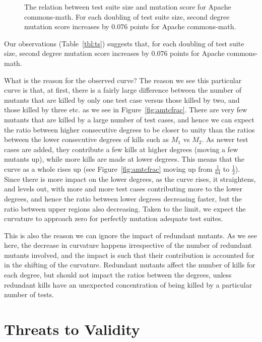 \documentclass[conference]{IEEEtran}
\newcounter{observation}
\begin{document}
\begin{figure}
\begin{Schunk}
{}

\end{Schunk}

\caption{The relation between test suite size and mutation score for Apache commons-math.
For each doubling of test suite size, second degree mutation score increases by 0.076
points for Apache commons-math.}
\label{fig:ts}
\end{figure}
Our observations (Table~\ref{tbl:ts}) suggests that, for each doubling of test
suite size, second degree mutation score increases by 0.076
points for Apache commons-math.

What is the reason for the observed curve? The reason we see this particular curve
is that, at first, there is a fairly large difference between the number
of mutants that are killed by only one test case versus those killed by two,
and those killed by three etc. as we see in Figure~\ref{fig:amtcfrac}.
There are very few mutants that are killed by a large number of test cases, and
hence we can expect the ratio between higher
consecutive degrees to be closer to unity than the ratios between the lower
consecutive degrees of kills such as $M_1$ vs $M_2$. As newer test cases are
added, they contribute a few kills at higher degrees (moving a few mutants up),
while more kills are made at lower degrees. This means that the curve as a
whole rises up (see Figure~\ref{fig:amtcfrac} moving up from $\frac{1}{64}$ to
$\frac{1}{2}$). Since there is more impact on the lower degrees, as the curve
rises, it straightens, and levels out, with more and more test cases
contributing more to the lower degrees, and hence the ratio between lower
degrees decreasing faster, but the ratio between upper regions also decreasing.
Taken to the limit, we expect the curvature to approach zero for perfectly
mutation adequate test suites.

This is also the reason we can ignore the impact of redundant mutants. As we
see here, the decrease in curvature happens irrespective of the number of
redundant mutants involved, and the impact is such that their contribution is
accounted for in the shifting of the curvature.  Redundant mutants affect the
number of kills for each degree, but should not impact the ratios between the
degrees, unless redundant kills have an unexpected concentration of being
killed by a particular number of tests.



\section{Threats to Validity}
\label{sec:threats}
\end{document}
